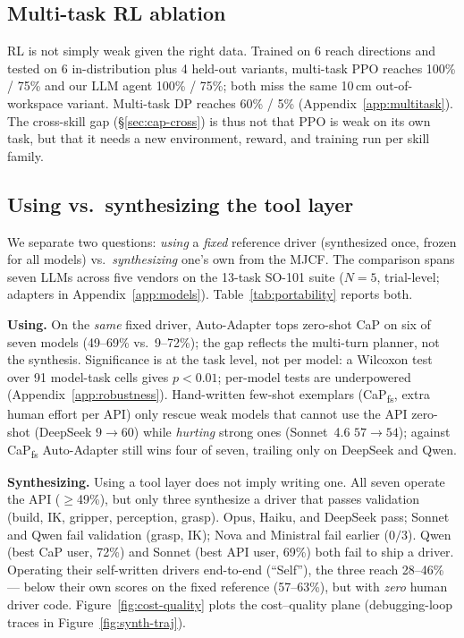 \subsection{Multi-task RL ablation}
\label{sec:cap-rlsteelman}

RL is not simply weak given the right data. Trained on 6 reach
directions and tested on 6 in-distribution plus 4 held-out variants,
multi-task PPO reaches 100\% / 75\% and our LLM agent 100\% / 75\%;
both miss the same 10\,cm out-of-workspace variant. Multi-task DP
reaches 60\% / 5\% (Appendix~\ref{app:multitask}). The cross-skill gap
(\S\ref{sec:cap-cross}) is thus not that PPO is weak on its own task,
but that it needs a new environment, reward, and training run per
skill family.

\subsection{Using vs.\ synthesizing the tool layer}
\label{sec:cap-portability}

We separate two questions:
\emph{using} a \emph{fixed} reference driver (synthesized once,
frozen for all models) vs.\
\emph{synthesizing} one's own from the MJCF. The comparison
spans seven LLMs across five vendors on the 13-task SO-101 suite
($N{=}5$, trial-level; adapters in Appendix~\ref{app:models}).
Table~\ref{tab:portability} reports both.



\noindent\textbf{Using.} On the \emph{same} fixed driver,
Auto-Adapter tops zero-shot CaP on six of seven models (49--69\%
vs.\ 9--72\%); the gap reflects the multi-turn planner, not the
synthesis. Significance is at the task
level, not per model: a Wilcoxon test over 91 model-task cells
gives $p{<}0.01$; per-model tests are underpowered
(Appendix~\ref{app:robustness}). Hand-written few-shot
exemplars (CaP\textsubscript{fs}, extra human effort per API) only
rescue weak models that cannot use the API zero-shot (DeepSeek
$9{\to}60$) while \emph{hurting} strong ones (Sonnet~4.6 $57{\to}54$);
against CaP\textsubscript{fs} Auto-Adapter still wins four of
seven, trailing only on DeepSeek and Qwen.

\noindent\textbf{Synthesizing.} Using a tool layer does not imply
writing one. All seven operate the API ($\geq$49\%), but only three
synthesize a driver that passes validation (build, IK, gripper,
perception, grasp). Opus, Haiku, and DeepSeek pass; Sonnet and Qwen fail
validation (grasp, IK); Nova and Ministral fail earlier ($0/3$).
Qwen (best CaP user, 72\%) and Sonnet (best API user, 69\%)
both fail to ship a driver. Operating their self-written drivers
end-to-end (``Self''), the three reach 28--46\% --- below their own
scores on the fixed reference (57--63\%), but with \emph{zero}
human driver code.
Figure~\ref{fig:cost-quality} plots the cost--quality plane
(debugging-loop traces in Figure~\ref{fig:synth-traj}).

